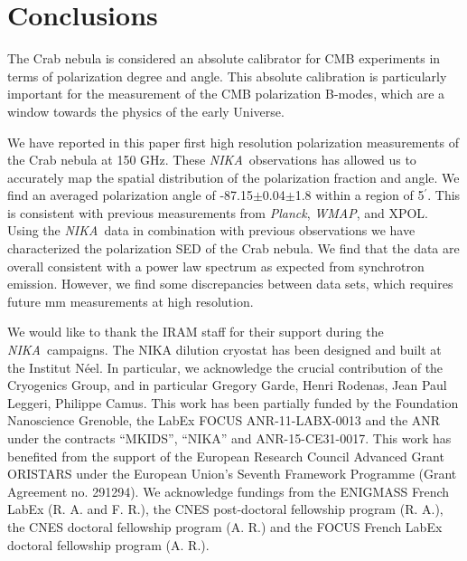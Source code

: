 \documentclass[twocolumn,traditabstract]{aa}
\def\NIKA{\textit{NIKA}}
\def\Planck{\textit{Planck}}
\def\WMAP{\textit{WMAP}}
\begin{document}
\section{Conclusions}\label{sec:conclusions}
The Crab nebula is considered an absolute calibrator for CMB experiments in terms of polarization degree and angle. This absolute calibration is particularly important for the measurement of the CMB polarization B-modes, which are a window towards the physics of the early Universe.

We have reported in this paper first high resolution polarization measurements of the Crab nebula at 150 GHz. These \NIKA\ observations has allowed us to accurately map the spatial distribution of the polarization fraction and angle. 
We find an averaged polarization angle of -87.15$\pm$0.04$\pm$1.8 within a region of 5$^\prime$.
This is consistent with previous measurements from \Planck, \WMAP, and XPOL.
Using the \NIKA\ data in combination with previous observations we have characterized the polarization SED of the Crab nebula. We find that the data are overall consistent with a power law spectrum as expected from synchrotron emission. However, we find some discrepancies between data sets, which requires future mm measurements at high resolution. 

\vspace{0.2cm}
 \begin{acknowledgements}
We would like to thank the IRAM staff for their support during the \NIKA\ campaigns. 
The NIKA dilution cryostat has been designed and built at the Institut N\'eel. 
In particular, we acknowledge the crucial contribution of the Cryogenics Group, and 
in particular Gregory Garde, Henri Rodenas, Jean Paul Leggeri, Philippe Camus. 
This work has been partially funded by the Foundation Nanoscience Grenoble, the LabEx FOCUS ANR-11-LABX-0013 and 
the ANR under the contracts ``MKIDS'', ``NIKA'' and ANR-15-CE31-0017. 
This work has benefited from the support of the European Research Council Advanced Grant ORISTARS 
under the European Union's Seventh Framework Programme (Grant Agreement no. 291294).
We acknowledge fundings from the ENIGMASS French LabEx (R. A. and F. R.), 
the CNES post-doctoral fellowship program (R. A.),  the CNES doctoral fellowship program (A. R.) and 
the FOCUS French LabEx doctoral fellowship program (A. R.).
\end{acknowledgements}



\end{document}
